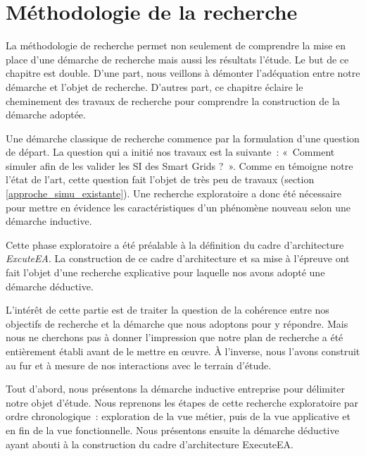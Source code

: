 \chapter{Méthodologie de la recherche}
\label{ch:methodo}

La méthodologie de recherche permet non seulement de comprendre la mise en place 
d'une démarche de recherche mais aussi les résultats l'étude. Le but de ce 
chapitre est double. D'une part, nous veillons à démonter l'adéquation entre 
notre démarche et l'objet de recherche. D'autres part, ce chapitre éclaire le 
cheminement des travaux de recherche pour comprendre la construction de la 
démarche adoptée. 

Une démarche classique de recherche commence par la formulation d'une question 
de départ. La question qui a initié nos travaux est la suivante~: «~Comment 
simuler afin de les valider les SI des Smart Grids ?~».  Comme en témoigne notre 
l'état de l'art, cette question fait l'objet de très peu de travaux (section 
\ref{approche_simu_existante}). Une recherche exploratoire a donc été nécessaire 
pour mettre en évidence les caractéristiques d'un phénomène nouveau selon une 
démarche inductive. 

Cette phase exploratoire a été préalable à la définition du cadre d'architecture 
\textit{ExcuteEA}. La construction de ce cadre d'architecture et sa mise à 
l'épreuve ont fait l'objet d'une recherche explicative pour laquelle nos avons 
adopté une démarche déductive.

L'intérêt de cette partie est de traiter la question de la cohérence entre nos 
objectifs de recherche et la démarche que nous adoptons pour y répondre. Mais 
nous ne cherchons pas à donner l'impression que notre plan de recherche a été 
entièrement établi avant de le mettre en œuvre. À l'inverse, nous l'avons 
construit au fur et à mesure de nos interactions avec le terrain d'étude. 

Tout d'abord, nous présentons la démarche inductive entreprise pour délimiter 
notre objet d'étude. Nous reprenons les étapes de cette recherche exploratoire 
par ordre chronologique~: exploration de la vue métier, puis de la vue 
applicative et en fin de la vue fonctionnelle. Nous présentons ensuite la 
démarche déductive ayant abouti à la construction du cadre d'architecture 
ExecuteEA.


